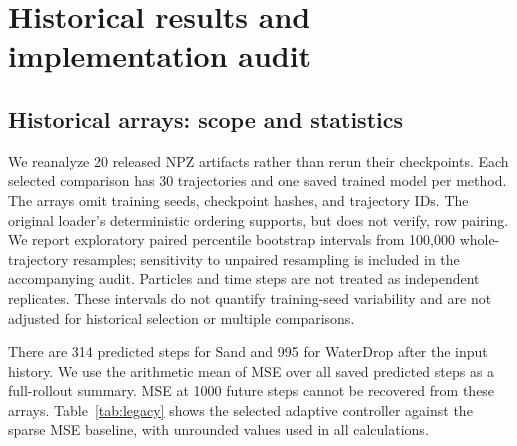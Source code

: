\clearpage
\appendix
\thispagestyle{empty}
\onecolumn
{}
\section{Historical results and implementation audit}
\label{sec:historical-audit}
\subsection{Historical arrays: scope and statistics}
We reanalyze 20 released NPZ artifacts rather than rerun their checkpoints. Each selected comparison has 30 trajectories and one saved trained model per method. The arrays omit training seeds, checkpoint hashes, and trajectory IDs. The original loader's deterministic ordering supports, but does not verify, row pairing. We report exploratory paired percentile bootstrap intervals from 100,000 whole-trajectory resamples; sensitivity to unpaired resampling is included in the accompanying audit. Particles and time steps are not treated as independent replicates. These intervals do not quantify training-seed variability and are not adjusted for historical selection or multiple comparisons.

There are 314 predicted steps for Sand and 995 for WaterDrop after the input history. We use the arithmetic mean of MSE over all saved predicted steps as a full-rollout summary. MSE at 1000 future steps cannot be recovered from these arrays. Table~\ref{tab:legacy} shows the selected adaptive controller against the sparse MSE baseline, with unrounded values used in all calculations.

